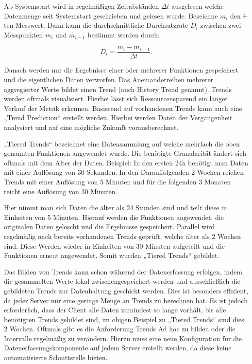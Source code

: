 Ab Systemstart wird in regelmäßigen Zeitabständen $\Delta t$ ausgelesen welche
Datenmenge seit Systemstart geschrieben und gelesen wurde. Bezeichne $m_i$ den
$i$-ten Messwert. Dann kann die durchschnittliche Durchsatzrate $D_i$ zwischen
zwei Messpunkten $m_i$ und $m_{i-1}$ bestimmt werden durch:

\[ D_i = \frac{m_{i} - m_{i-1}}{\Delta t}.\]

Danach werden nur die Ergebnisse einer oder mehrerer Funktionen gespeichert und
die eigentlichen Daten verworfen. Das Aneinanderreihen mehrerer aggregierter
Werte bildet einen Trend (auch History Trend genannt). Trends werden oftmals
visualisiert. Hierbei lässt sich Ressourcensparend ein langer Verlauf der
Metrik erkennen. Basierend auf vorhandenen Trends kann auch eine „Trend
Prediction“ erstellt werden. Hierbei werden Daten der Vergangenheit analysiert
und auf eine mögliche Zukunft vorausberechnet.

„Tiered Trends“ bezeichnet eine Datensammlung auf welche mehrfach die oben
genannten Funktionen angewendet wurde. Die benötigte Granularität ändert sich
oftmals mit dem Alter der Daten. Beispiel: In den ersten 24h benötigt man Daten
mit einer Auflösung von 30 Sekunden. In den Darauffolgenden 2 Wochen reichen
Trends mit einer Auflösung von 5 Minuten und für die folgenden 3 Monaten reicht
eine Auflösung von 30 Minuten.

Hier nimmt man sich Daten die älter als 24 Stunden sind und teilt diese in
Einheiten von 5 Minuten. Hierauf werden die Funktionen angewendet, die
originalen Daten gelöscht und die Ergebnisse gespeichert. Parallel wird
regelmäßig nach bereits vorhandenen Trends geprüft, welche älter als 2 Wochen
sind. Diese Werden wieder in Einheiten von 30 Minuten aufgeteilt und die
Funktionen erneut angewendet. Somit wurden „Tiered Trends“ gebildet.

Das Bilden von Trends kann schon während der Datenerfassung erfolgen, indem die
gesammelten Werte lokal zwischengespeichert werden und ausschließlich die
gebildeten Trends zur Datenhaltung geschickt werden. Dies ist besonders
effizient, da jeder Server nur eine geringe Menge an Trends zu berechnen hat.
Es ist jedoch erforderlich, dass der Client alle Daten zumindest so lange
vorhält, bis alle benötigten Trends gebildet sind, im obigen Beispiel zu
„Tiered Trends“ sind dies 2 Wochen. Oftmals gibt es die Anforderung Trends Ad
hoc zu bilden oder die Intervalle regelmäßig zu verändern. Hierzu muss eine
neue Konfiguration für die Datenerfassungskomponente auf jedem Server erstellt
werden, da diese keine automatisierte Schnittstelle bieten.

